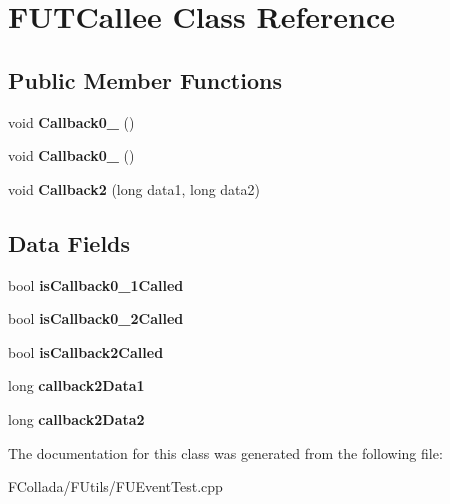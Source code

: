 \hypertarget{classFUTCallee}{
\section{FUTCallee Class Reference}
\label{classFUTCallee}
}
\subsection*{Public Member Functions}
\begin{DoxyCompactItemize}
\item 
\hypertarget{classFUTCallee_afa5098b38456f309257cb3acb818000b}{
void {\bfseries Callback0\_} ()}
\label{classFUTCallee_afa5098b38456f309257cb3acb818000b}

\item 
\hypertarget{classFUTCallee_a25de343aa5eea5d65b4d585b8916891a}{
void {\bfseries Callback0\_} ()}
\label{classFUTCallee_a25de343aa5eea5d65b4d585b8916891a}

\item 
\hypertarget{classFUTCallee_a4c8d46e3ea20dc61da593e0e56469b55}{
void {\bfseries Callback2} (long data1, long data2)}
\label{classFUTCallee_a4c8d46e3ea20dc61da593e0e56469b55}

\end{DoxyCompactItemize}
\subsection*{Data Fields}
\begin{DoxyCompactItemize}
\item 
\hypertarget{classFUTCallee_a1cc51dfe1cb10349f9ede95d7e916118}{
bool {\bfseries isCallback0\_\-1Called}}
\label{classFUTCallee_a1cc51dfe1cb10349f9ede95d7e916118}

\item 
\hypertarget{classFUTCallee_af018ebe56fe5c0eae9aeec189a7215c4}{
bool {\bfseries isCallback0\_\-2Called}}
\label{classFUTCallee_af018ebe56fe5c0eae9aeec189a7215c4}

\item 
\hypertarget{classFUTCallee_a300716b8f9899e52c860a9e888350039}{
bool {\bfseries isCallback2Called}}
\label{classFUTCallee_a300716b8f9899e52c860a9e888350039}

\item 
\hypertarget{classFUTCallee_ab579d5adc730f2d67bae0cb661c4a244}{
long {\bfseries callback2Data1}}
\label{classFUTCallee_ab579d5adc730f2d67bae0cb661c4a244}

\item 
\hypertarget{classFUTCallee_a869181a0622fb400740e41dd02e1098b}{
long {\bfseries callback2Data2}}
\label{classFUTCallee_a869181a0622fb400740e41dd02e1098b}

\end{DoxyCompactItemize}


The documentation for this class was generated from the following file:\begin{DoxyCompactItemize}
\item 
FCollada/FUtils/FUEventTest.cpp\end{DoxyCompactItemize}
